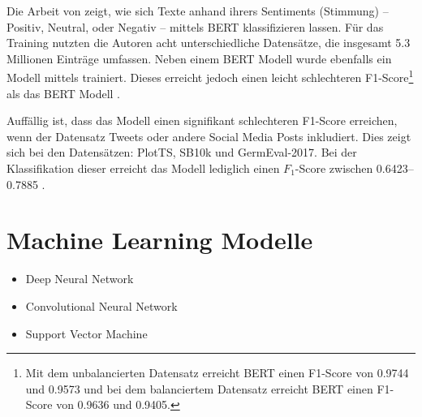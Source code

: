 


Die Arbeit von \textcite{guhr_training_2020} zeigt, wie sich Texte anhand ihrers Sentiments (Stimmung) -- Positiv, Neutral, oder Negativ -- mittels \ac{BERT} klassifizieren lassen. Für das Training nutzten die Autoren acht unterschiedliche Datensätze, die insgesamt \num{5.3} Millionen Einträge umfassen. Neben einem \ac{BERT} Modell wurde ebenfalls ein Modell mittels \ft trainiert. Dieses erreicht jedoch einen leicht schlechteren F1-Score\footnote{Mit dem unbalancierten Datensatz erreicht \ac{BERT} einen F1-Score von \num{0.9744} und \ft \num{0.9573} und bei dem balanciertem Datensatz erreicht \ac{BERT} einen F1-Score von \num{0.9636} und \ft \num{0.9405}.} als das \ac{BERT} Modell \autocite[]{guhr_training_2020}.

Auffällig ist, dass das Modell einen signifikant schlechteren F1-Score erreichen, wenn der Datensatz Tweets oder andere Social Media Posts inkludiert. Dies zeigt sich bei den Datensätzen: PlotTS, SB10k und GermEval-2017. Bei der Klassifikation dieser erreicht das Modell lediglich einen \(F_{1}\)-Score zwischen \numrange{0.6423}{0.7885} \autocite[1631]{guhr_training_2020}.

\section{Machine Learning Modelle}

\begin{itemize}
    \item Deep Neural Network
    \item Convolutional Neural Network
    \item Support Vector Machine
\end{itemize}

